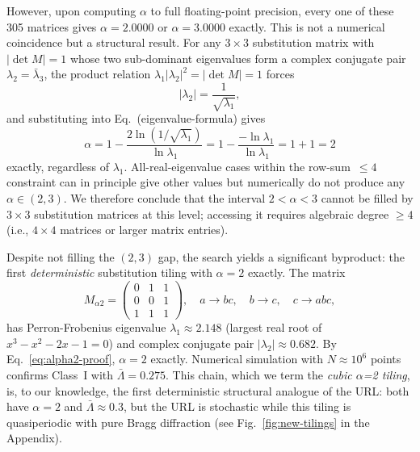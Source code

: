\documentclass[11pt]{article}
\begin{document}
However, upon computing $\alpha$ to full floating-point precision, every one of these 305
matrices gives $\alpha = 2.0000$ or $\alpha = 3.0000$ exactly. This is not a numerical
coincidence but a structural result. For any $3\times 3$ substitution matrix with
$|\det M| = 1$ whose two sub-dominant eigenvalues form a complex conjugate pair
$\lambda_2 = \bar\lambda_3$, the product relation
$\lambda_1 |\lambda_2|^2 = |\det M| = 1$ forces
\begin{equation}
  |\lambda_2| = \frac{1}{\sqrt{\lambda_1}},
  \label{eq:cubic-det}
\end{equation}
and substituting into Eq.~(eigenvalue-formula) gives
\begin{equation}
  \alpha = 1 - \frac{2 \ln(1/\sqrt{\lambda_1})}{\ln \lambda_1}
         = 1 - \frac{-\ln \lambda_1}{\ln \lambda_1}
         = 1 + 1 = 2
  \label{eq:alpha2-proof}
\end{equation}
exactly, regardless of $\lambda_1$. All-real-eigenvalue cases within the row-sum~$\leq 4$
constraint can in principle give other values but numerically do not produce any $\alpha \in (2,3)$.
We therefore conclude that the interval $2 < \alpha < 3$ cannot be filled by $3\times 3$
substitution matrices at this level; accessing it requires algebraic degree $\geq 4$ (i.e.,
$4\times 4$ matrices or larger matrix entries).

Despite not filling the $(2,3)$ gap, the search yields a significant byproduct: the first
\emph{deterministic} substitution tiling with $\alpha = 2$ exactly. The matrix
\begin{equation}
  M_{\alpha 2} = \begin{pmatrix} 0 & 1 & 1 \\ 0 & 0 & 1 \\ 1 & 1 & 1 \end{pmatrix},
  \quad
  a \to bc, \quad b \to c, \quad c \to abc,
  \label{eq:alpha2-matrix}
\end{equation}
has Perron-Frobenius eigenvalue $\lambda_1 \approx 2.148$ (largest real root of
$x^3 - x^2 - 2x - 1 = 0$) and complex conjugate pair $|\lambda_2| \approx 0.682$.
By Eq.~\eqref{eq:alpha2-proof}, $\alpha = 2$ exactly. Numerical simulation with
$N \approx 10^6$ points confirms Class~I with $\bar\Lambda = 0.275$.
This chain, which we term the \textit{cubic $\alpha$=2 tiling}, is, to our knowledge, the
first deterministic structural analogue of the URL: both have $\alpha = 2$ and $\bar\Lambda \approx 0.3$, but
the URL is stochastic while this tiling is quasiperiodic with pure Bragg diffraction (see Fig.~\ref{fig:new-tilings} in the Appendix).
\end{document}
